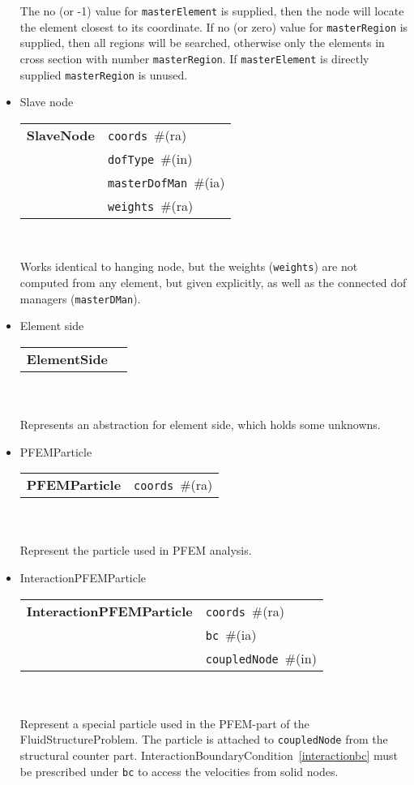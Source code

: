 \documentclass[a4paper]{report}
\newcommand{\param}[1]{\texttt{#1}} %
\newcommand{\field}[2]{\param{#1}~\#{\tiny(#2)}} %
\newcommand{\entKeywordInst}[1]{\textbf{#1}} %
\newenvironment{record}[1][]{\begin{tabular}{|ll}}{\end{tabular}\\}
\newcommand{\recentry}[2]{{#1}&{#2}\\}
\newcounter{rcc}
\newenvironment{record}[1][\textwidth]{\setcounter{rcc}{0}\rowcolors{1}{lightgray}{lightgray}\tabularx{#1}{llR} \hline}
               {\endtabularx}
\newcommand{\recentry}[2]{\ifthenelse{\value{rcc}>0}{$\backslash$ \\}{\setcounter{rcc}{1}}{#1}&{#2}&}
\begin{document}
\begin{itemize}
The no (or -1) value for \param{masterElement} is supplied, then the node will locate the element closest to its coordinate.
If no (or zero) value for \param{masterRegion} is supplied, then all regions will be searched,
otherwise only the elements in cross section with number \param{masterRegion}.
If \param{masterElement} is directly supplied \param{masterRegion} is unused.

\item Slave node

\begin{record}[0.9\textwidth]
  \recentry{\entKeywordInst{SlaveNode}}{\field{coords}{ra}}
  \recentry{}{\field{dofType}{in}}
  \recentry{}{\field{masterDofMan}{ia}}
  \recentry{}{\field{weights}{ra}}
\end{record}

Works identical to hanging node, but the weights (\param{weights}) are not computed from any element,
but given explicitly, as well as the connected dof managers (\param{masterDMan}).

\item Element side

\begin{record}[0.9\textwidth]
  \recentry{\entKeywordInst{ElementSide}}{}
\end{record}\\
Represents an abstraction for element side, which holds some unknowns.

\item PFEMParticle \label{pfemparticles}

\begin{record}[0.9\textwidth]
  \recentry{\entKeywordInst{PFEMParticle}}{\field{coords}{ra}}
\end{record}\\
Represent the particle used in PFEM analysis.

\item InteractionPFEMParticle \label{interactionparticle}

\begin{record}[0.9\textwidth]
  \recentry{\entKeywordInst{InteractionPFEMParticle}}{\field{coords}{ra}}
  \recentry{}{\field{bc}{ia}}
  \recentry{}{\field{coupledNode}{in}}
\end{record}\\
Represent a special particle used in the PFEM-part of the FluidStructureProblem. The particle is 
attached to \param{coupledNode} from the structural counter part. InteractionBoundaryCondition~\ref{interactionbc} must be prescribed under \param{bc} to access the velocities from solid nodes.

\end{itemize}
\end{document}
